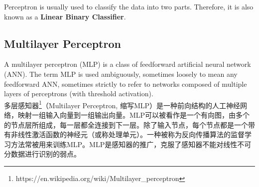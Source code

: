 \documentclass[11pt]{article}
\begin{document}
\begin{framed}
  \begin{center}
    Perceptron is usually used to classify the data into two parts. Therefore, it is also known as a \textbf{Linear Binary Classifier}.
  \end{center}
\end{framed}

\subsection{Multilayer Perceptron}
A multilayer perceptron (MLP) is a class of feedforward artificial neural network (ANN). The term MLP is used ambiguously, sometimes loosely to mean any feedforward ANN, sometimes strictly to refer to networks composed of multiple layers of perceptrons (with threshold activation).\\
多层感知器\footnote{https://en.wikipedia.org/wiki/Multilayer\_perceptron}（Multilayer Perceptron, 缩写MLP）是一种前向结构的人工神经网络，映射一组输入向量到一组输出向量。MLP可以被看作是一个有向图，由多个的节点层所组成，每一层都全连接到下一层。除了输入节点，每个节点都是一个带有非线性激活函数的神经元（或称处理单元）。一种被称为反向传播算法的监督学习方法常被用来训练MLP。MLP是感知器的推广，克服了感知器不能对线性不可分数据进行识别的弱点。
\begin{center}


\end{center}
\end{document}
